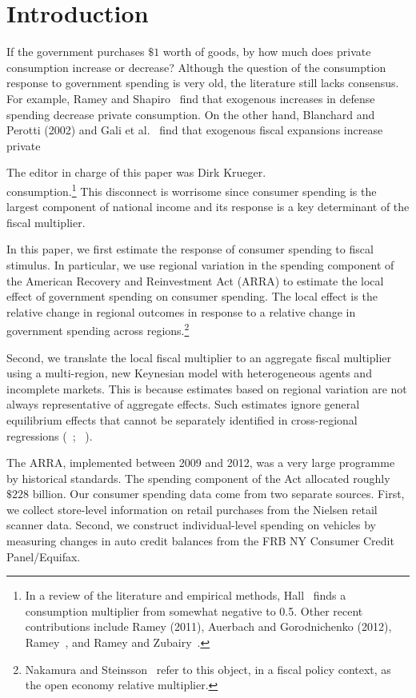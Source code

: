 \documentclass[\latexroot/\projectname]{subfiles}
\begin{document}
\section{Introduction}
\whenintegrated{\label{sec:intro}} %
\setcounter{page}{0}

If the government purchases $\$ 1$ worth of goods, by how much does private consumption increase or decrease? Although the question of the consumption response to government spending is very old, the literature still lacks consensus. For example, Ramey and Shapiro~\cite{Ramey1998-as} find that exogenous increases in defense spending decrease private consumption. On the other hand, Blanchard and Perotti (2002) and Gali et al.~\cite{Gali2007-ji} find that exogenous fiscal expansions increase private

The editor in charge of this paper was Dirk Krueger.\\
consumption.\footnote{In a review of the literature and empirical methods, Hall~\cite{Hall2009-mz} finds a consumption multiplier from somewhat negative to 0.5. Other recent contributions include Ramey (2011), Auerbach and Gorodnichenko (2012), Ramey~\cite{Ramey2016-tn}, and Ramey and Zubairy~\cite{Ramey2018-rc}.} This disconnect is worrisome since consumer spending is the largest component of national income and its response is a key determinant of the fiscal multiplier.

In this paper, we first estimate the response of consumer spending to fiscal stimulus. In particular, we use regional variation in the spending component of the American Recovery and Reinvestment Act (ARRA) to estimate the local effect of government spending on consumer spending. The local effect is the relative change in regional outcomes in response to a relative change in government spending across regions.\footnote{Nakamura and Steinsson~\cite{Nakamura2011-dw} refer to this object, in a fiscal policy context, as the open economy relative multiplier.}

Second, we translate the local fiscal multiplier to an aggregate fiscal multiplier using a multi-region, new Keynesian model with heterogeneous agents and incomplete markets. This is because estimates based on regional variation are not always representative of aggregate effects. Such estimates ignore general equilibrium effects that cannot be separately identified in cross-regional regressions (~\cite{Nakamura2018-wz}; ~\cite{Chodorow-Reich2019-zl}).

The ARRA, implemented between 2009 and 2012, was a very large programme by historical standards. The spending component of the Act allocated roughly $\$ 228$ billion. Our consumer spending data come from two separate sources. First, we collect store-level information on retail purchases from the Nielsen retail scanner data. Second, we construct individual-level spending on vehicles by measuring changes in auto credit balances from the FRB NY Consumer Credit Panel/Equifax.
\end{document}
